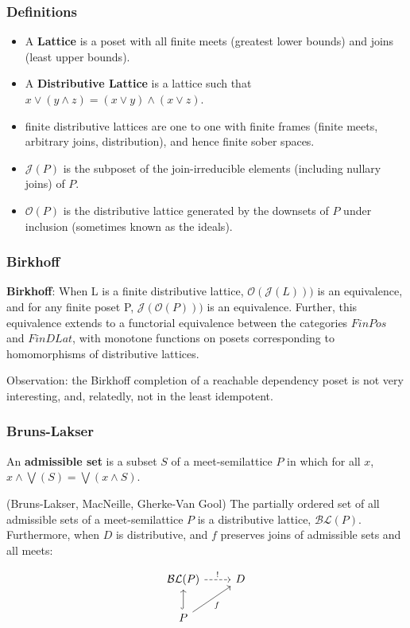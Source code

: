 \documentclass{beamer}
\newcommand{\Oc}{\mathcal{O}}
\newcommand{\Jc}{\mathcal{J}}
\newcommand{\BLc}{\mathcal{BL}}
\begin{document}
\begin{frame}
\frametitle{Definitions}
\begin{itemize}
\item A \textbf{Lattice} is a poset with all finite meets (greatest lower bounds) and joins (least upper bounds).

\item A \textbf{Distributive Lattice} is a lattice such that \(x \vee (y \wedge z) = (x \vee y) \wedge (x \vee z)\). 

\item finite distributive lattices are one to one with finite frames (finite meets, arbitrary joins, distribution), and hence finite sober spaces.

\item \textbf{\(\Jc(P)\)} is the subposet of the join-irreducible elements (including nullary joins) of \(P\).

\item \textbf{\(\Oc(P)\)} is the distributive lattice generated by the downsets of \(P\) under inclusion (sometimes known as the ideals).
\end{itemize}
\end{frame}	

\begin{frame}
\frametitle{Birkhoff}
\begin{theorem}
\textbf{Birkhoff}: When L is a finite distributive lattice, \(\Oc(\Jc(L)))\) is an equivalence, and for any finite poset P,  \(\Jc(\Oc(P)))\) is an equivalence. Further, this equivalence extends to a functorial equivalence between the categories \(FinPos\) and \(FinDLat\), with monotone functions on posets corresponding to homomorphisms of distributive lattices.
\end{theorem}

Observation: the Birkhoff completion of a reachable dependency poset is not very interesting, and, relatedly, not in the least idempotent.
\end{frame}


\begin{frame}[fragile]
\frametitle{Bruns-Lakser}
An \textbf{admissible set} is a subset \(S\) of a meet-semilattice \(P\) in which for all \(x\), \(x \wedge \bigvee(S) = \bigvee(x \wedge S)\).

\begin{theorem}
(Bruns-Lakser, MacNeille, Gherke-Van Gool) The partially ordered set of all admissible sets of a meet-semilattice \(P\) is a distributive lattice, \(\BLc(P)\). Furthermore, when \(D\) is distributive, and \(f\) preserves joins of admissible sets and all meets:

\begin{equation*}
\begin{tikzcd}
\BLc(P) \arrow[r, "!",dashed]            & D \\
P \arrow[u, hook] \arrow[ru, "f"'] &  
\end{tikzcd}
\end{equation*}
\end{theorem}

\end{frame}
\end{document}
